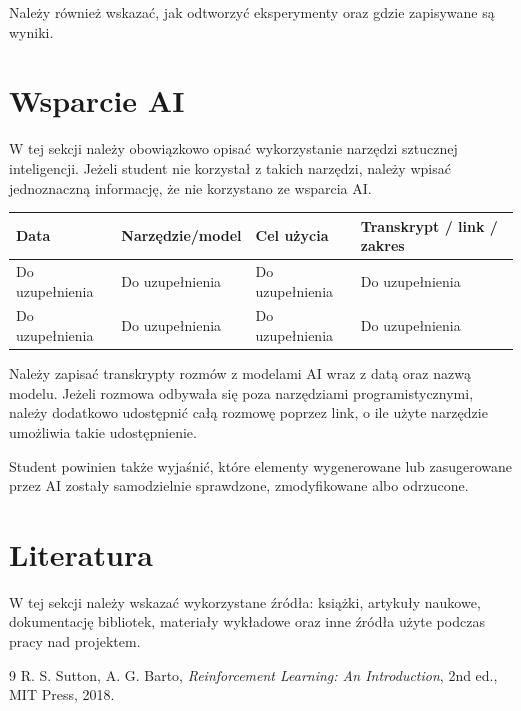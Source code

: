 \documentclass[12pt]{article}
\begin{document}
Należy również wskazać, jak odtworzyć eksperymenty oraz gdzie zapisywane są wyniki.

\section{Wsparcie AI}

W tej sekcji należy obowiązkowo opisać wykorzystanie narzędzi sztucznej inteligencji. Jeżeli student nie korzystał z takich narzędzi, należy wpisać jednoznaczną informację, że nie korzystano ze wsparcia AI.

\begin{center}
\begin{tabular}{p{}p{}p{}p{}}
\toprule
Data & Narzędzie/model & Cel użycia & Transkrypt / link / zakres \\
\midrule
Do uzupełnienia & Do uzupełnienia & Do uzupełnienia & Do uzupełnienia \\
Do uzupełnienia & Do uzupełnienia & Do uzupełnienia & Do uzupełnienia \\
\bottomrule
\end{tabular}
\end{center}

Należy zapisać transkrypty rozmów z modelami AI wraz z datą oraz nazwą modelu. Jeżeli rozmowa odbywała się poza narzędziami programistycznymi, należy dodatkowo udostępnić całą rozmowę poprzez link, o ile użyte narzędzie umożliwia takie udostępnienie.

Student powinien także wyjaśnić, które elementy wygenerowane lub zasugerowane przez AI zostały samodzielnie sprawdzone, zmodyfikowane albo odrzucone.

\section{Literatura}

W tej sekcji należy wskazać wykorzystane źródła: książki, artykuły naukowe, dokumentację bibliotek, materiały wykładowe oraz inne źródła użyte podczas pracy nad projektem.

\begin{thebibliography}{9}
R. S. Sutton, A. G. Barto, \textit{Reinforcement Learning: An Introduction}, 2nd ed., MIT Press, 2018.
\end{thebibliography}
\end{document}

